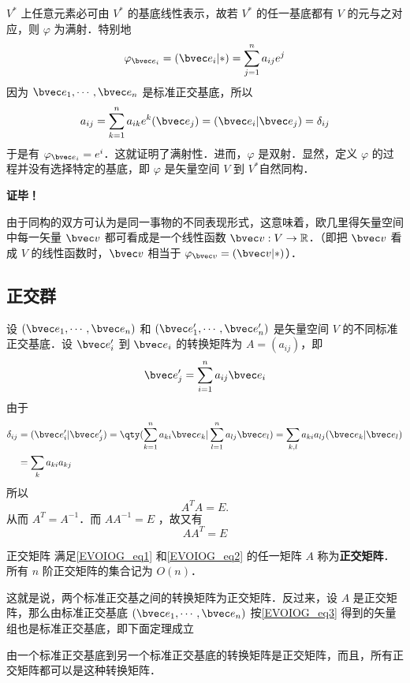 $V^*$ 上任意元素必可由 $V^*$ 的基底线性表示，故若 $V^*$ 的任一基底都有 $V$ 的元与之对应，则 $\varphi$ 为满射．特别地
\begin{equation}
\varphi_{\bvec e_i}=(\bvec e_i|*)=\sum_{j=1}^{n} a_{ij}e^j
\end{equation}
因为  $\bvec e_1,\cdots,\bvec e_n$ 是标准正交基底，所以
\begin{equation}
a_{ij}=\sum_{k=1}^n a_{ik}e^k(\bvec e_j)=(\bvec e_i|\bvec e_j)=\delta_{ij}
\end{equation}
于是有 $\varphi_{\bvec e_i}=e^i$．这就证明了满射性．进而，$\varphi$ 是双射．显然，定义 $\varphi$ 的过程并没有选择特定的基底，即 $\varphi$ 是矢量空间 $V$ 到 $V^*$自然同构．

\textbf{证毕！}

由于同构的双方可认为是同一事物的不同表现形式，这意味着，欧几里得矢量空间中每一矢量 $\bvec v$ 都可看成是一个线性函数 $\bvec v:V\rightarrow\mathbb{R}$．（即把 $\bvec v$ 看成 $V$ 的线性函数时，$\bvec v$ 相当于 $\varphi_{\bvec v}=(\bvec v|*)$）．
\subsection{正交群}
设 $(\bvec e_1,\cdots,\bvec e_n)$ 和 $(\bvec e'_1,\cdots,\bvec e'_n)$ 是矢量空间 $V$ 的不同标准正交基底．设 $\bvec e'_i$ 到 $\bvec e_i$ 的转换矩阵为 $A=(a_{ij})$，即
\begin{equation}\label{EVOIOG_eq3}
\bvec e'_j=\sum_{i=1}^n a_{ij}\bvec e_i
\end{equation}
由于
\begin{equation}
\begin{aligned}
\delta_{ij}&=(\bvec e'_i|\bvec e'_j)=\qty(\sum_{k=1}^n a_{ki}\bvec e_k|\sum_{l=1}^n a_{lj}\bvec e_l)=\sum_{k,l}a_{ki}a_{lj}(\bvec e_k|\bvec e_l)\\
&=\sum_{k}a_{ki}a_{kj}
\end{aligned}
\end{equation}
所以 
\begin{equation}\label{EVOIOG_eq1}
A^T A=E.
\end{equation}
从而 $A^T=A^{-1}$．而 $AA^{-1}=E$ ，故又有
\begin{equation}\label{EVOIOG_eq2}
AA^T=E
\end{equation}
\begin{definition}{正交矩阵}
满足\autoref{EVOIOG_eq1} 和\autoref{EVOIOG_eq2} 的任一矩阵 $A$ 称为\textbf{正交矩阵}．所有 $n$ 阶正交矩阵的集合记为 $O(n)$．
\end{definition}
这就是说，两个标准正交基之间的转换矩阵为正交矩阵．反过来，设 $A$ 是正交矩阵，那么由标准正交基底 $(\bvec e_1,\cdots,\bvec e_n)$ 按\autoref{EVOIOG_eq3} 得到的矢量组也是标准正交基底，即下面定理成立
\begin{theorem}{}
由一个标准正交基底到另一个标准正交基底的转换矩阵是正交矩阵，而且，所有正交矩阵都可以是这种转换矩阵．
\end{theorem}

